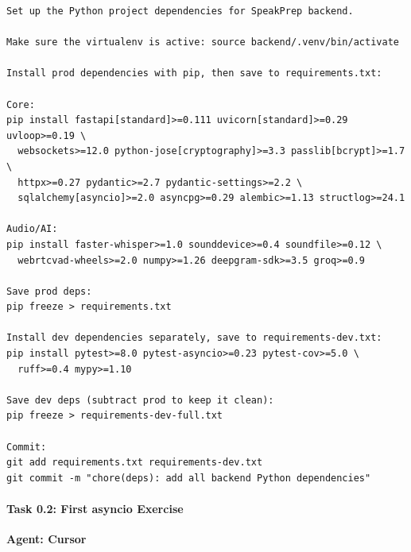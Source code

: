 \documentclass[
  11pt,
]{article}
\begin{document}
\begin{lstlisting}
Set up the Python project dependencies for SpeakPrep backend.

Make sure the virtualenv is active: source backend/.venv/bin/activate

Install prod dependencies with pip, then save to requirements.txt:

Core:
pip install fastapi[standard]>=0.111 uvicorn[standard]>=0.29 uvloop>=0.19 \
  websockets>=12.0 python-jose[cryptography]>=3.3 passlib[bcrypt]>=1.7 \
  httpx>=0.27 pydantic>=2.7 pydantic-settings>=2.2 \
  sqlalchemy[asyncio]>=2.0 asyncpg>=0.29 alembic>=1.13 structlog>=24.1

Audio/AI:
pip install faster-whisper>=1.0 sounddevice>=0.4 soundfile>=0.12 \
  webrtcvad-wheels>=2.0 numpy>=1.26 deepgram-sdk>=3.5 groq>=0.9

Save prod deps:
pip freeze > requirements.txt

Install dev dependencies separately, save to requirements-dev.txt:
pip install pytest>=8.0 pytest-asyncio>=0.23 pytest-cov>=5.0 \
  ruff>=0.4 mypy>=1.10

Save dev deps (subtract prod to keep it clean):
pip freeze > requirements-dev-full.txt

Commit:
git add requirements.txt requirements-dev.txt
git commit -m "chore(deps): add all backend Python dependencies"
\end{lstlisting}

\hypertarget{task-0.2-first-asyncio-exercise}{%
\paragraph{Task 0.2: First asyncio
Exercise}\label{task-0.2-first-asyncio-exercise}}

\textbf{Agent: Cursor}
\end{document}
